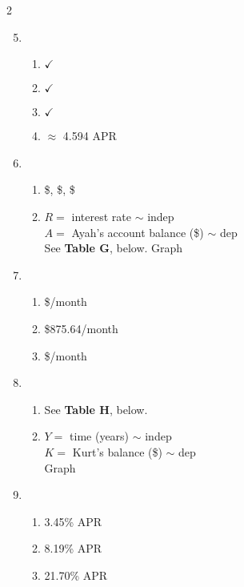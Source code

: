 \begin{multicols} {2}
\begin{enumerate}
\setcounter{enumi}{4}

\item %
\begin{enumerate}
\item $\checkmark$
\item $\checkmark$
\item $\checkmark$
\item $\approx$ 4.594 APR
\end{enumerate}

\item %
\begin{enumerate}
\item  \$, \$, \$
\item $R=$ interest rate $\sim$ indep \\ $A=$ Ayah's account balance (\$) $\sim$ dep \\
See \textbf{Table G}, below.  Graph
\end{enumerate}

\item %
\begin{enumerate}
\item \$/month
\item \$875.64/month
\item \$/month
\end{enumerate}

\item %
\begin{enumerate}
\item See \textbf{Table H}, below.  
\item $Y=$ time (years) $\sim$ indep \\ $K=$ Kurt's balance (\$) $\sim$ dep \\Graph
\end{enumerate}

\item %
\begin{enumerate}
\item 3.45\% APR
\item 8.19\% APR
\item 21.70\% APR
\end{enumerate}

\end{enumerate}
\end{multicols}

